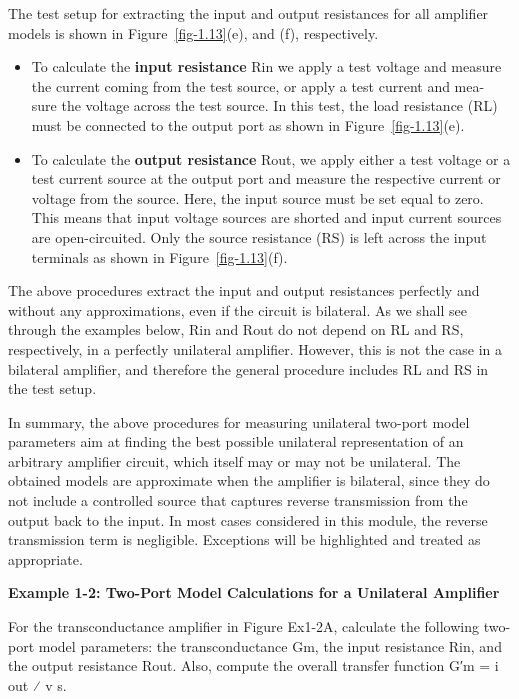 \documentclass[
  11pt,
  letterpaper,
  abstract]{scrbook}
\begin{document}
The test setup for extracting the input and output resistances for all
amplifier models is shown in Figure~\ref{fig-1.13}(e), and (f),
respectively.

\begin{itemize}
\item
  To calculate the \textbf{input resistance} Rin we apply a test voltage
  and measure the current coming from the test source, or apply a test
  current and mea- sure the voltage across the test source. In this
  test, the load resistance (RL) must be connected to the output port as
  shown in Figure~\ref{fig-1.13}(e).
\item
  To calculate the \textbf{output resistance} Rout, we apply either a
  test voltage or a test current source at the output port and measure
  the respective current or voltage from the source. Here, the input
  source must be set equal to zero. This means that input voltage
  sources are shorted and input current sources are open-circuited. Only
  the source resistance (RS) is left across the input terminals as shown
  in Figure~\ref{fig-1.13}(f).
\end{itemize}

The above procedures extract the input and output resistances perfectly
and without any approximations, even if the circuit is bilateral. As we
shall see through the examples below, Rin and Rout do not depend on RL
and RS, respectively, in a perfectly unilateral amplifier. However, this
is not the case in a bilateral amplifier, and therefore the general
procedure includes RL and RS in the test setup.

In summary, the above procedures for measuring unilateral two-port model
parameters aim at finding the best possible unilateral representation of
an arbitrary amplifier circuit, which itself may or may not be
unilateral. The obtained models are approximate when the amplifier is
bilateral, since they do not include a controlled source that captures
reverse transmission from the output back to the input. In most cases
considered in this module, the reverse transmission term is negligible.
Exceptions will be highlighted and treated as appropriate.

\textbf{Example 1-2: Two-Port Model Calculations for a Unilateral
Amplifier}

For the transconductance amplifier in Figure Ex1-2A, calculate the
following two-port model parameters: the transconductance Gm, the input
resistance Rin, and the output resistance Rout. Also, compute the
overall transfer function G′m = i out ⁄ v s.
\end{document}
